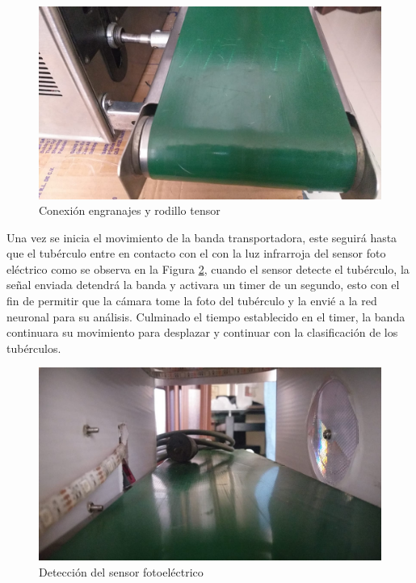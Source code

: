 		
		\begin{figure}[ht]
			\centering
			\includegraphics[scale=0.21]{Figs/202.jpg}
			\caption{Conexión engranajes y rodillo tensor}
			\label{fig:eje}
		\end{figure}

\newpage	
		Una vez se inicia el movimiento de la banda transportadora, este seguirá hasta que el tubérculo entre en contacto con el con la luz infrarroja del sensor foto eléctrico como se observa en la Figura \ref{fig:sensor}, cuando el sensor detecte el tubérculo, la señal enviada detendrá la banda y activara un timer de un segundo, esto con el fin de permitir que la cámara tome la foto del tubérculo y la envié a la red neuronal para su análisis. Culminado el tiempo establecido en el timer, la banda continuara su movimiento para desplazar y continuar con la clasificación de los tubérculos.
		
			\begin{figure}[ht]
			\centering
			\includegraphics[scale=0.23]{Figs/203.jpg}
			\caption{Detección del sensor fotoeléctrico}
			\label{fig:sensor}
			\end{figure}
	
